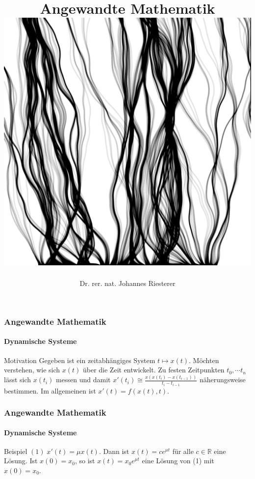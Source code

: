 \documentclass{beamer}
\begin{document}
\title[Angewandte Mathematik] %
{Angewandte Mathematik
\\
\includegraphics[scale=0.15]{images/cover}
}
\subtitle{}
\author[Dr. Johannes Riesterer] %
{Dr.  rer. nat. Johannes Riesterer}

\date[KPT 2004] %
{}

\subject{Angewandte Mathematik}




\begin{frame}
    \frametitle{Angewandte Mathematik}
\framesubtitle{Dynamische Systeme }
\begin{block}{Motivation}
Gegeben ist ein zeitabhängiges System $t \mapsto x(t)$. 
Möchten verstehen, wie sich $x(t)$ über die Zeit entwickelt. 
Zu festen Zeitpunkten $t_0, \cdots t_n $ lässt sich $x(t_i)$ messen und damit $x'(t_i) \cong \frac{x(x(t_i) - x(t_{i-1}))}{t_i - t_{i-1}}$ näherungsweise bestimmen. Im allgemeinen ist $x'(t) = f(x(t), t)$. 
\end{block}
 \end{frame}

\begin{frame}
    \frametitle{Angewandte Mathematik}
\framesubtitle{Dynamische Systeme }
\begin{block}{Beispiel}
$(1) \;x'(t) = \mu x(t)$.  
Dann ist $x(t)= c e^{\mu t}$ für alle $c \in \mathbb{R}$ eine Lösung. Ist $x(0) = x_0$, so ist   $x(t)= x_0 e^{\mu t}$ eine Lösung von (1) mit $x(0) = x_0$. 
\end{block}
 \end{frame}
\end{document}
